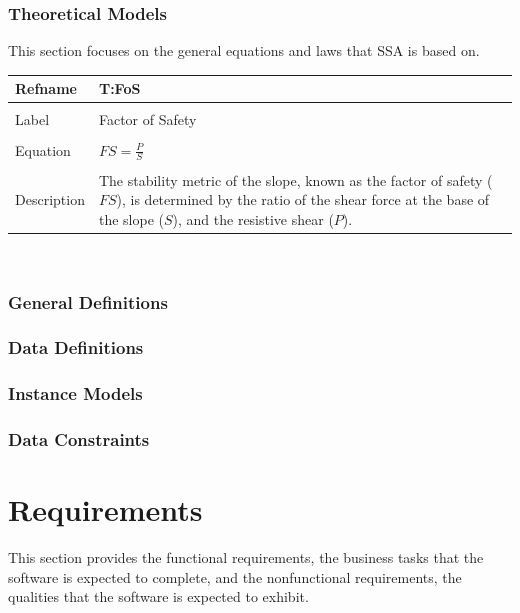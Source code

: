 \documentclass[12pt]{article}
\begin{document}
\subsubsection{Theoretical Models}
\label{Sec:TM}
This section focuses on the general equations and laws that SSA is based on.
~\newline
\noindent \begin{minipage}{\textwidth}
\begin{tabular}{p{} p{}}
\toprule \textbf{Refname} & \textbf{T:FoS}
\label{T:FoS}
\\ \midrule \\
Label & Factor of Safety
\\ \midrule \\
Equation & $FS=\frac{P}{S}$
\\ \midrule \\
Description & The stability metric of the slope, known as the factor of safety ($FS$), is determined by the ratio of the shear force at the base of the slope ($S$), and the resistive shear ($P$).
\\ \bottomrule \end{tabular}
\end{minipage}\\
\subsubsection{General Definitions}
\label{Sec:GD}
\subsubsection{Data Definitions}
\label{Sec:DD}
\subsubsection{Instance Models}
\label{Sec:IM}
\subsubsection{Data Constraints}
\label{Sec:DC}
\section{Requirements}
\label{Sec:R}
This section provides the functional requirements, the business tasks that the software is expected to complete, and the nonfunctional requirements, the qualities that the software is expected to exhibit.
\end{document}
